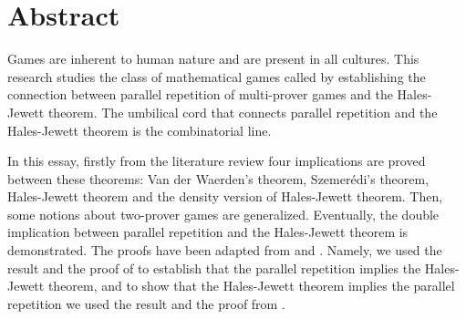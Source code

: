 
\chapter*{Abstract} 

Games are inherent to  human nature and are present in all cultures. This research studies the class of mathematical games  called  
by establishing the connection between parallel repetition of multi-prover games and the Hales-Jewett theorem. The umbilical cord that connects parallel repetition and the Hales-Jewett theorem is the combinatorial line.

In this essay, firstly from the literature review 
four implications are proved between these theorems: Van der Waerden's theorem, Szemerédi's theorem, Hales-Jewett theorem and the density version of Hales-Jewett theorem. Then,  some notions about  two-prover games
are  generalized. Eventually, the double implication between parallel repetition and the Hales-Jewett theorem is 
demonstrated. The proofs have been adapted from \cite{verbitsky1996towards} and \cite*{hkazla2016forbidden}. Namely, we used the result and the proof of \cite{verbitsky1996towards} to establish that the parallel repetition implies the Hales-Jewett theorem, and to show that the Hales-Jewett theorem implies the parallel repetition we used the result and the proof from \cite*{hkazla2016forbidden}.





